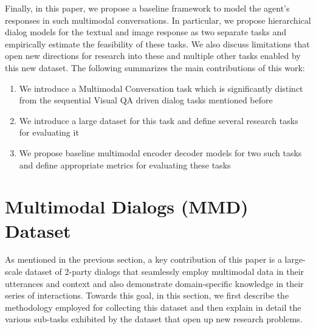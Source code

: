 \documentclass[letterpaper]{article} %
\begin{document}
Finally, in this paper, we propose a baseline framework to model the agent's responses in such multimodal conversations. In particular, we propose hierarchical dialog models for the textual and image response as two separate tasks and empirically estimate the feasibility of these tasks. We also discuss limitations that open new directions for research into these and multiple other tasks enabled by this new dataset. The following summarizes the main contributions of this work:
\begin{enumerate}[$\bullet$,leftmargin=*,noitemsep,topsep=0pt]
\item We introduce a Multimodal Conversation task which is significantly distinct from the sequential Visual QA driven dialog tasks mentioned before
\item We introduce a large dataset for this task and define several research tasks for evaluating it
\item We propose baseline multimodal encoder decoder models for two such tasks and define appropriate metrics for evaluating these tasks
\end{enumerate}


\section{Multimodal Dialogs (MMD) Dataset}

As mentioned in the previous section, a key contribution of this paper is a large-scale dataset of 2-party dialogs that seamlessly employ multimodal data in their utterances and context and also demonstrate domain-specific knowledge in their series of interactions. Towards this goal, in this section, we first describe the methodology employed for collecting this dataset and then explain in detail the various sub-tasks exhibited by the dataset that open up new research problems.
\end{document}
